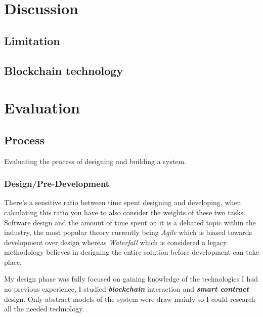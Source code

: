 \documentclass[12pt]{article}
\newcommand{\keyword}[1]{\textbf{\textit{#1}}}
\begin{document}
\section{Discussion}
\subsection{Limitation}

\subsection{Blockchain technology}

\section{Evaluation}
\subsection{Process}
Evaluating the process of designing and building a system.

\subsubsection{Design/Pre-Development}

There's a sensitive ratio between time spent designing and developing, when calculating this ratio you have to also consider the weights of these two tasks. Software design and the amount of time spent on it is a debated topic within the industry, the most popular theory currently being \textit{Agile} which is biased towards development over design whereas \textit{Waterfall} which is considered a legacy methodology believes in designing the entire solution before development can take place.

My design phase was fully focused on gaining knowledge of the technologies I had no previous experience, I studied \keyword{blockchain} interaction and \keyword{smart contract} design. Only abstract models of the system were draw mainly so I could research all the needed technology.
\end{document}
